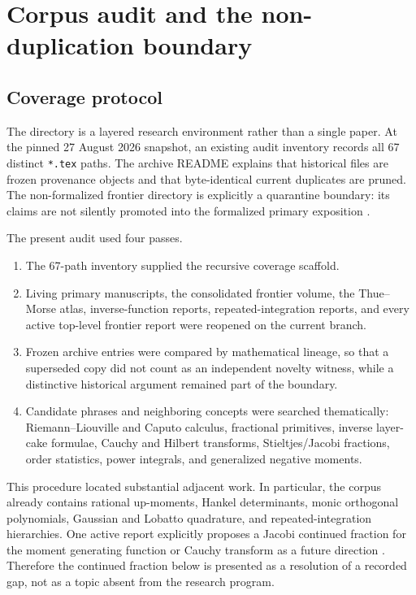 \documentclass[11pt,oneside]{article}
\theoremstyle{definition}
\theoremstyle{remark}
\newcommand{\1}{\mathbf 1}
\begin{document}
\clearpage

\section{Corpus audit and the non-duplication boundary}
\label{p8:sec:audit}

\subsection{Coverage protocol}

The directory \repo{} is a layered research environment rather than a single
paper.  At the pinned 27 August 2026 snapshot, an existing audit inventory
records all 67 distinct \texttt{*.tex} paths.  The archive README explains that
historical files are frozen provenance objects and that byte-identical current
duplicates are pruned.  The non-formalized frontier directory is explicitly a
quarantine boundary: its claims are not silently promoted into the formalized
primary exposition \cite{p8:proveitArchive,p8:proveitFrontierReadme,p8:proveitNewton}.

The present audit used four passes.
\begin{enumerate}
\item The 67-path inventory supplied the recursive coverage scaffold.
\item Living primary manuscripts, the consolidated frontier volume, the
      Thue--Morse atlas, inverse-function reports, repeated-integration reports,
      and every active top-level frontier report were reopened on the current
      branch.
\item Frozen archive entries were compared by mathematical lineage, so that a
      superseded copy did not count as an independent novelty witness, while a
      distinctive historical argument remained part of the boundary.
\item Candidate phrases and neighboring concepts were searched thematically:
      Riemann--Liouville and Caputo calculus, fractional primitives, inverse
      layer-cake formulae, Cauchy and Hilbert transforms, Stieltjes/Jacobi
      fractions, order statistics, power integrals, and generalized negative
      moments.
\end{enumerate}

This procedure located substantial adjacent work.  In particular, the corpus
already contains rational up-moments, Hankel determinants, monic orthogonal
polynomials, Gaussian and Lobatto quadrature, and repeated-integration
hierarchies.  One active report explicitly proposes a Jacobi continued fraction
for the moment generating function or Cauchy transform as a future direction
\cite{p8:proveitQuadrature}.  Therefore the continued fraction below is presented
as a resolution of a recorded gap, not as a topic absent from the research
program.
\end{document}
